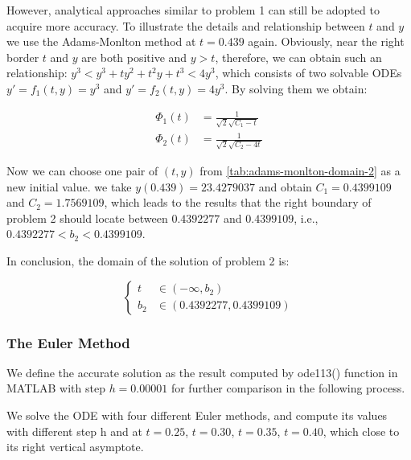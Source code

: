 \documentclass[a4paper]{article}
\begin{document}
	However, analytical approaches similar to problem 1 can still be adopted to acquire more accuracy. To illustrate the details and relationship between $t$ and $y$ we use the Adams-Monlton method at $t = 0.439$ again. Obviously, near the right border $t$ and $y$ are both positive and $y > t$, therefore, we can obtain such an relationship: $y^3 < y^3 + ty^2 +t^2y +t^3 < 4y^3$, which consists of two solvable ODEs $y' = f_1(t, y) = y^3$ and $y' = f_2(t, y) = 4y^3$. By solving them we obtain:
	
	\begin{align}
		\Phi_1(t) &= \frac{1}{\sqrt{2}\sqrt{C_1 - t}} \\
		\Phi_2(t) &= \frac{1}{\sqrt{2}\sqrt{C_2 - 4t}}
	\end{align}
	
	Now we can choose one pair of $(t, y)$ from \autoref{tab:adams-monlton-domain-2} as a new initial value. we take $y(0.439) = 23.4279037$ and obtain $C_1 = 0.4399109$ and $C_2 = 1.7569109$, which leads to the results that the right boundary of problem 2 should locate between $0.4392277$ and $0.4399109$, i.e., $0.4392277 < b_2 < 0.4399109$.
	
	In conclusion, the domain of the solution of problem 2 is:
	
	$$
	\left\{
	\begin{aligned}
		t &\in (-\infty, b_2) \nonumber \\
		b_2 &\in (0.4392277, 0.4399109) \nonumber
	\end{aligned}
	\right.
	$$
	
	
	\subsubsection{The Euler Method}
	
	We define the accurate solution as the result computed by ode113() function in MATLAB with step $h = 0.00001$ for further comparison in the following process. 
	
	We solve the ODE with four different Euler methods, and compute its values with different step h and at $t = 0.25$, $t = 0.30$, $t = 0.35$, $t = 0.40$, which close to its right vertical asymptote.
	
\end{document}
